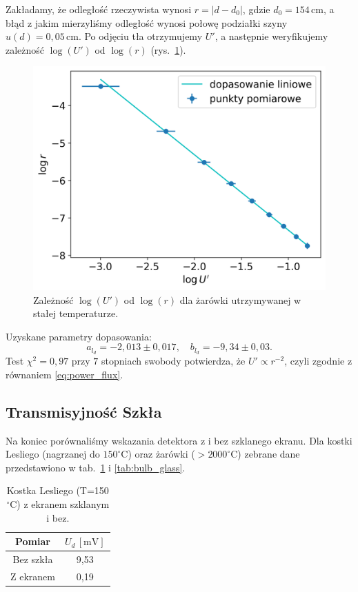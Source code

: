 \documentclass[12pt]{article}
\begin{document}
Zakładamy, że odległość rzeczywista wynosi $r = |d - d_0|$, gdzie $d_0=154\,\mathrm{cm}$, a błąd z jakim mierzyliśmy odległość wynosi połowę podziałki szyny $u(d) = 0{,}05 \, \mathrm{cm}$. Po odjęciu tła otrzymujemy $U'$, a następnie weryfikujemy zależność $\log(U')$ od $\log(r)$ (rys.~\ref{fig:boltzman_distance}).

\begin{figure}[H]
	\centering
	\includegraphics[scale=0.6]{boltzman_distance}
	\caption{Zależność $\log(U')$ od $\log(r)$ dla żarówki utrzymywanej w stałej temperaturze.}
	\label{fig:boltzman_distance}
\end{figure}

Uzyskane parametry dopasowania:
\[
	a_{l_d}=-2{,}013 \pm 0{,}017, 
	\quad 
	b_{l_d}=-9{,}34 \pm 0{,}03.
\]
Test $\chi^2=0{,}97$ przy $7$ stopniach swobody potwierdza, że $U'\propto r^{-2}$, czyli zgodnie z równaniem \eqref{eq:power_flux}.

\subsection{Transmisyjność Szkła}
Na koniec porównaliśmy wskazania detektora z i bez szklanego ekranu. Dla kostki Lesliego (nagrzanej do $150^\circ\mathrm{C}$) oraz żarówki ($>2000^\circ\mathrm{C}$) zebrane dane przedstawiono w tab.~\ref{tab:cube_glass} i \ref{tab:bulb_glass}.

\begin{table}[H]
	\centering
	\begin{tabular}{cc}
		\toprule
		Pomiar      & $U_d\,[\mathrm{mV}]$ \\
		\midrule
		Bez szkła   & 9{,}53 \\
		Z ekranem   & 0{,}19 \\
		\bottomrule
	\end{tabular}
	\caption{Kostka Lesliego (T=150$^\circ$C) z ekranem szklanym i bez.}
	\label{tab:cube_glass}
\end{table}
\end{document}
